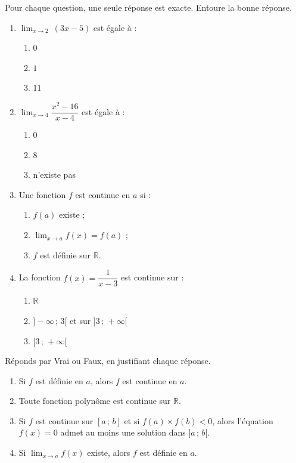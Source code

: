 \documentclass[11pt]{article}
\begin{document}
\begin{exercice}
Pour chaque question, une seule réponse est exacte. Entoure la bonne réponse.
\begin{enumerate}
\item $\displaystyle\lim_{x \to 2}\ (3x-5)$ est égale à :
\begin{enumerate}
\item $0$ \hspace{1cm} \item $1$ \hspace{1cm} \item $11$
\end{enumerate}
\item $\displaystyle\lim_{x \to 4}\dfrac{x^2-16}{x-4}$ est égale à :
\begin{enumerate}
\item $0$ \hspace{1cm} \item $8$ \hspace{1cm} \item n'existe pas
\end{enumerate}
\item Une fonction $f$ est continue en $a$ si :
\begin{enumerate}
\item $f(a)$ existe ;
\item $\displaystyle\lim_{x \to a} f(x) = f(a)$ ;
\item $f$ est définie sur $\mathbb{R}$.
\end{enumerate}
\item La fonction $f(x)=\dfrac{1}{x-3}$ est continue sur :
\begin{enumerate}
\item $\mathbb{R}$ \hspace{1cm} \item $]-\infty\,;\,3[$ et sur $]3\,;\,+\infty[$ \hspace{1cm} \item $[3\,;\,+\infty[$
\end{enumerate}
\end{enumerate}
\end{exercice}

\begin{exercice}
Réponds par Vrai ou Faux, en justifiant chaque réponse.
\begin{enumerate}
\item Si $f$ est définie en $a$, alors $f$ est continue en $a$.
\item Toute fonction polynôme est continue sur $\mathbb{R}$.
\item Si $f$ est continue sur $[a\,;\,b]$ et si $f(a)\times f(b) < 0$, alors l'équation $f(x)=0$ admet au moins une solution dans $]a\,;\,b[$.
\item Si $\displaystyle\lim_{x \to a} f(x)$ existe, alors $f$ est définie en $a$.
\end{enumerate}
\end{exercice}
\end{document}
